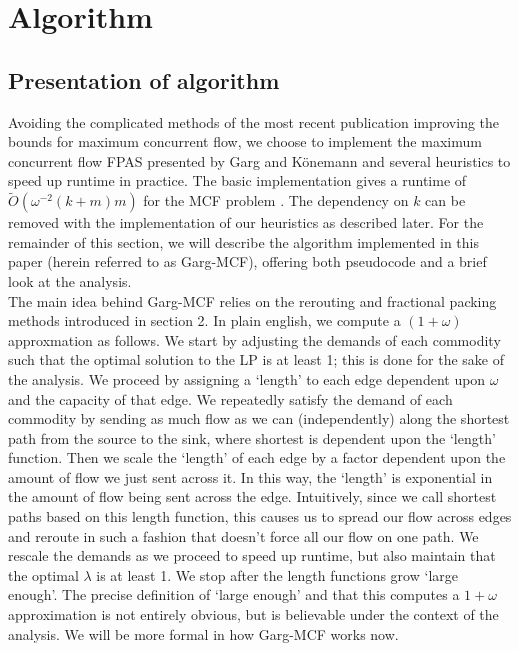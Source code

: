 \section{Algorithm}
\subsection{Presentation of algorithm}
Avoiding the complicated methods of the most recent publication
improving the bounds for maximum concurrent flow, we choose to
implement the maximum concurrent flow FPAS presented by Garg and
K\"{o}nemann and several heuristics to speed up runtime in
practice. The basic implementation gives a runtime of
$\tilde{O}(\omega^{-2}(k+m)m)$ for the MCF problem \cite{garg}. The dependency on $k$
can be removed with
the implementation of our heuristics as described later. For the
remainder of this section, we will describe the algorithm implemented
in this paper (herein referred to as Garg-MCF), offering both
pseudocode and a brief look at the analysis. \\
The main idea behind Garg-MCF relies on the rerouting and fractional
packing methods introduced in section 2. In plain english, we compute
a $(1+\omega)$ approxmation as follows. We start by adjusting the
demands of each commodity such that the optimal solution to the LP is
at least 1; this is done for the sake of the analysis. We proceed by assigning a `length' to each edge
dependent upon $\omega$ and
the capacity of that edge. We repeatedly satisfy the
demand of each commodity by sending as much flow as we can
(independently) along the
shortest path from the source to the sink, where shortest is dependent
upon the `length' function. Then we scale the `length' of each edge by
a factor dependent upon the amount of flow we just sent across it. In
this way, the `length' is exponential in the amount of flow being sent
across the edge. Intuitively, since we call shortest paths based on
this length function, this causes us to spread our flow across edges
and reroute in such a fashion that doesn't force all our flow on one
path. We rescale the demands as we proceed to speed up runtime, but
also maintain that the optimal $\lambda$ is at least 1. We stop after the length functions grow `large enough'. The
precise definition of `large enough' and that this computes a $1+\omega$ approximation is not
entirely obvious, but is believable under the context of the
analysis. We will be more formal in how Garg-MCF works
now.

